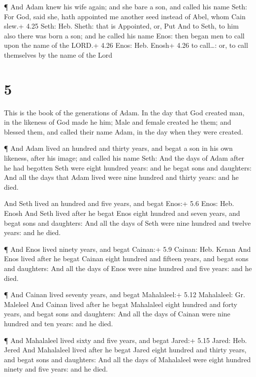  ¶ And Adam knew his wife again; and she bare a son, and
called his name Seth: For God, said she, hath appointed me another seed
instead of Abel, whom Cain slew.+ 4.25 Seth: Heb. Sheth: that is
Appointed, or, Put  And to Seth, to him also there was born
a son; and he called his name Enos: then began men to call upon the name
of the LORD.+ 4.26 Enos: Heb. Enosh+ 4.26 to call\ldots: or, to call
themselves by the name of the Lord

\hypertarget{section-4}{%
\section{5}\label{section-4}}

 This is the book of the generations of Adam. In the day
that God created man, in the likeness of God made he him; 
Male and female created he them; and blessed them, and called their name
Adam, in the day when they were created.

 ¶ And Adam lived an hundred and thirty years, and begat a
son in his own likeness, after his image; and called his name Seth:
 And the days of Adam after he had begotten Seth were eight
hundred years: and he begat sons and daughters:  And all the
days that Adam lived were nine hundred and thirty years: and he died.

 And Seth lived an hundred and five years, and begat Enos:+
5.6 Enos: Heb. Enosh  And Seth lived after he begat Enos
eight hundred and seven years, and begat sons and daughters:
 And all the days of Seth were nine hundred and twelve
years: and he died.

 ¶ And Enos lived ninety years, and begat Cainan:+ 5.9
Cainan: Heb. Kenan  And Enos lived after he begat Cainan
eight hundred and fifteen years, and begat sons and daughters:
 And all the days of Enos were nine hundred and five years:
and he died.

 ¶ And Cainan lived seventy years, and begat Mahalaleel:+
5.12 Mahalaleel: Gr. Maleleel  And Cainan lived after he
begat Mahalaleel eight hundred and forty years, and begat sons and
daughters:  And all the days of Cainan were nine hundred
and ten years: and he died.

 ¶ And Mahalaleel lived sixty and five years, and begat
Jared:+ 5.15 Jared: Heb. Jered  And Mahalaleel lived after
he begat Jared eight hundred and thirty years, and begat sons and
daughters:  And all the days of Mahalaleel were eight
hundred ninety and five years: and he died.

